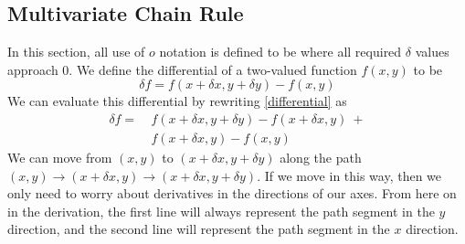 \documentclass{article}
\begin{document}
\subsection{Multivariate Chain Rule}
In this section, all use of $o$ notation is defined to be where all required $\delta$ values approach 0. We define the differential of a two-valued function $f(x, y)$ to be
\begin{equation}\label{differential}
	\delta f = f(x + \delta x, y + \delta y) - f(x, y)
\end{equation}
We can evaluate this differential by rewriting \eqref{differential} as
\begin{align*}
	\delta f =\  & f(x + \delta x, y + \delta y) - f(x + \delta x, y)\ + \\
	             & f(x + \delta x, y) - f(x, y)
\end{align*}
We can move from $(x, y)$ to $(x + \delta x, y + \delta y)$ along the path $(x, y) \to (x + \delta x, y) \to (x + \delta x, y + \delta y)$. If we move in this way, then we only need to worry about derivatives in the directions of our axes. From here on in the derivation, the first line will always represent the path segment in the $y$ direction, and the second line will represent the path segment in the $x$ direction.
\end{document}
